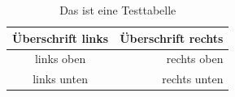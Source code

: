 \begin{table}[htb]
\centering
\caption{Das ist eine Testtabelle}\vspace{6pt}
\label{fig:PCM_Slurry1}
\begin{tabular}{cr} 
\hline
\textbf{Überschrift links} & \textbf{Überschrift rechts}\\
\hline 
links oben & rechts oben \\  
links unten & rechts unten \\ 
\hline 
\end{tabular}
\label{tab:Tabelle}
\end{table}

